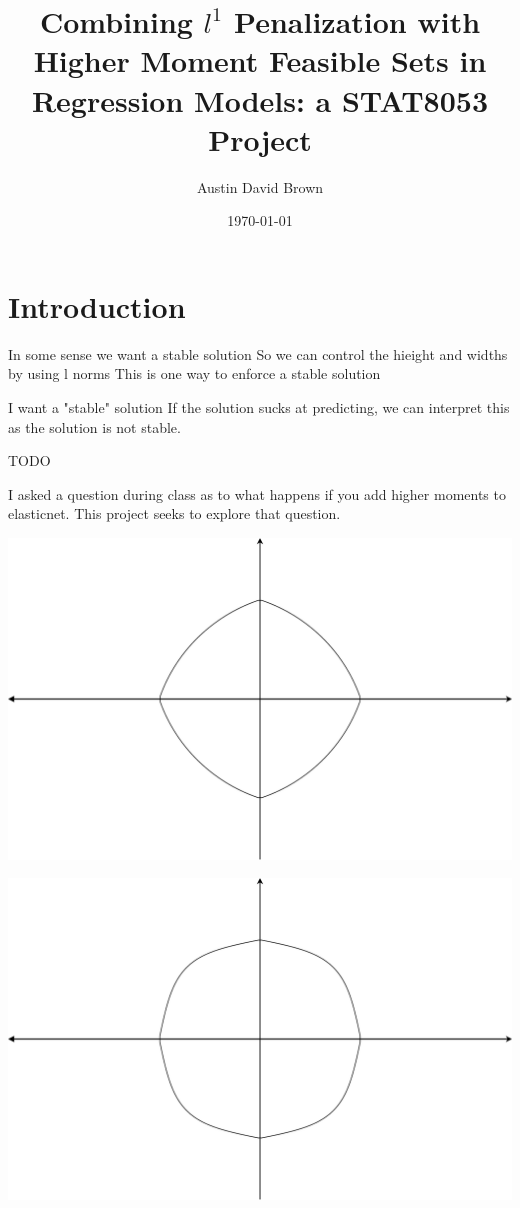 \documentclass[12pt, a4paper, reqno]{article}
\numberwithin{equation}{section}
\begin{document}
\title{Combining $l^1$ Penalization with Higher Moment Feasible Sets in Regression Models: a STAT8053 Project}
\author{Austin David Brown}
\date{\today}
\maketitle

\section{Introduction}


In some sense we want a stable solution
So we can control the hieight and widths by using l norms
This is one way to enforce a stable solution

I want a "stable" solution
If the solution sucks at predicting, we can interpret this as the solution is not stable.

TODO

I asked a question during class as to what happens if you add higher moments to elasticnet. This project seeks to explore that question.


\begin{center}
\begin{minipage}{.5\textwidth}
  \centering
  \includegraphics[width=.9\linewidth]{elnet.pdf}
\end{minipage}%
\begin{minipage}{.5\textwidth}
  \centering
  \includegraphics[width=.9\linewidth]{4_moment.pdf}
\end{minipage}
\end{center}
\end{document}

